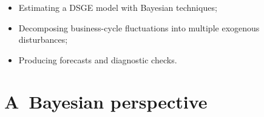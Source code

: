 \documentclass[a4paper,12pt]{article}%
\begin{document}
\FRONTPAGE%

\vspace{4ex}
\begin{myobjs}%


\begin{itemize}
\item Estimating a DSGE model with Bayesian techniques;

\item Decomposing business-cycle fluctuations into multiple exogenous disturbances;

\item Producing forecasts and diagnostic checks.
\end{itemize}

%

\end{myobjs}%


\newpage

\section{A\ Bayesian perspective}
\end{document}
